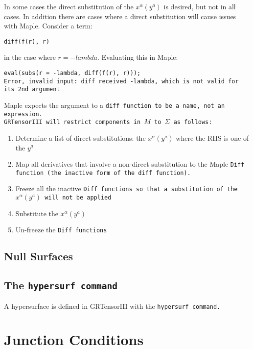 \documentclass{article}
\begin{document}
In some cases the direct substitution of the $x^\alpha(y^a)$ is desired, but not in all cases. In addition there are cases where
a direct substitution will cause issues with Maple. Consider a term:
\begin{center}
\text\tt{diff(f(r), r)}
\end{center}
in the case where $r=-lambda$. Evaluating this in Maple:
\begin{center}
\begin{verbatim}
eval(subs(r = -lambda, diff(f(r), r)));
Error, invalid input: diff received -lambda, which is not valid for its 2nd argument
\end{verbatim}
\end{center}
Maple expects the argument to a \text\tt{diff} function to be a name, not an expression. \\

GRTensorIII will restrict components in $M$ to $\Sigma$ as follows:
\begin{enumerate}
\item Determine a list of direct substitutions: the $x^\alpha(y^a)$ where the RHS is one of the $y^a$
\item Map all derivatives that involve a non-direct substitution to the Maple \text\tt{Diff} function (the
inactive form of the \text\tt{diff} function). 
\item Freeze all the inactive \text\tt{Diff} functions so that a substitution of the $x^\alpha(y^a)$ will not 
be applied
\item Substitute the $x^\alpha(y^a)$
\item Un-freeze the \text\tt{Diff} functions
\end{enumerate}



\subsection{Null Surfaces}

\subsection{The \text\tt{hypersurf} command}

A hypersurface is defined in GRTensorIII with the \text\tt{hypersurf} command. 

\section{Junction Conditions}


\vfill


\end{document}
